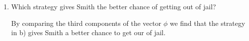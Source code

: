 \begin{enumerate}[label=\alph*)]
\item
Which strategy gives Smith the better chance of getting out of jail?
\begin{solution}[0.5cm]
By comparing the third components of the vector $\phi$ we find that 
the strategy in b) gives Smith a better chance to get our of jail.
\end{solution}
\end{enumerate}